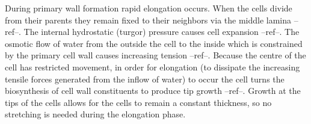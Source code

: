 During primary wall formation rapid elongation occurs. When the cells divide
from their parents they remain fixed to their neighbors via the middle lamina
--ref--. The internal hydrostatic (turgor) pressure causes cell expansion
--ref--. The osmotic flow of water from the outside the cell to the inside which
is constrained by the primary cell wall causes increasing tension --ref--.
Because the centre of the cell has restricted movement, in order for elongation
(to dissipate the increasing tensile forces generated from the inflow of water)
to occur the cell turns the biosynthesis of cell wall constituents to produce
tip growth --ref--. Growth at the tips of the cells allows for the cells to
remain a constant thickness, so no stretching is needed during the elongation
phase.
